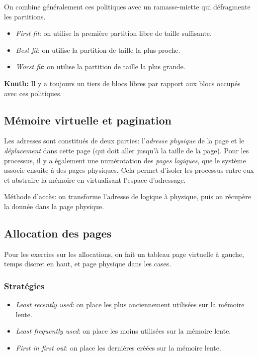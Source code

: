 \documentclass[a4paper]{article}
\begin{document}
\begin{multicols*}{2}
    On combine généralement ces politiques avec un ramasse-miette qui défragmente les partitions.

    \begin{itemize}
        \item \emph{First fit}: on utilise la première partition libre de taille suffisante.
        \item \emph{Best fit}: on utilise la partition de taille la plus proche.
        \item \emph{Worst fit}: on utilise la partition de taille la plus grande.
    \end{itemize}

    \textbf{Knuth:} Il y a toujours un tiers de blocs libres par rapport aux blocs occupés avec ces politiques.

    \subsection{Mémoire virtuelle et pagination}

    Les adresses sont constitués de deux parties: l'\emph{adresse physique} de la page et le \emph{déplacement} dans cette page (qui doit aller jusqu'à la taille de la page).
    Pour les processus, il y a également une numérotation des \emph{pages logiques}, que le système associe ensuite à des pages physiques. Cela permet d'isoler les processus entre eux et abstraire la mémoire en virtualisant l'espace d'adressage.

    Méthode d'accès: on transforme l'adresse de logique à physique, puis on récupère la donnée dans la page physique.

    \subsection{Allocation des pages}

    Pour les exercies sur les allocations, on fait un tableau page virtuelle à gauche, temps discret en haut, et page physique dans les cases.

    \subsubsection{Stratégies}
    \begin{itemize}
        \item \emph{Least recently used}: on place les plus anciennement utilisées sur la mémoire lente.
        \item \emph{Least frequently used}: on place les moins utilisées sur la mémoire lente.
        \item \emph{First in first out}: on place les dernières créées sur la mémoire lente.
    \end{itemize}


\end{multicols*}
\end{document}
